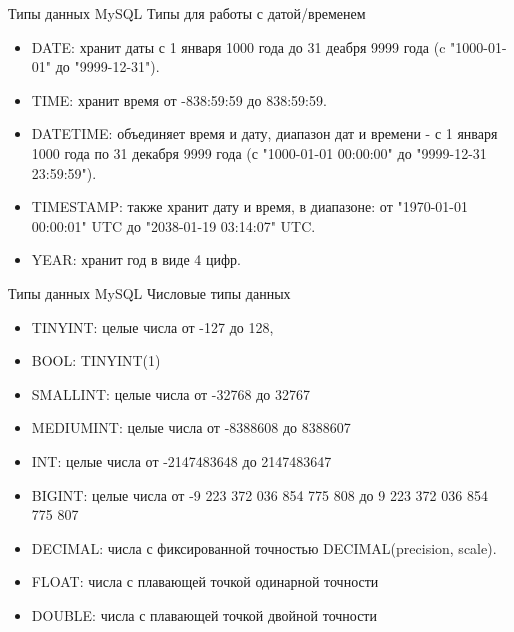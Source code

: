 \documentclass{beamer}
\begin{document}
\begin{frame}{Типы данных MySQL}
	Типы для работы с датой/временем
	\begin{itemize}
		\item DATE: хранит даты с 1 января 1000 года до 31 деабря 9999 года (c "1000-01-01" до "9999-12-31"). 
		\item TIME: хранит время от -838:59:59 до 838:59:59. 
		\item DATETIME: объединяет время и дату, диапазон дат и времени - с 1 января 1000 года по 31 декабря 9999 		года (с "1000-01-01 00:00:00" до "9999-12-31 23:59:59"). 
		\item TIMESTAMP: также хранит дату и время, в диапазоне: от "1970-01-01 00:00:01" UTC до "2038-01-19 03:14:07" UTC. 
		\item YEAR: хранит год в виде 4 цифр. 
	\end{itemize}
\end{frame}

\begin{frame}{Типы данных MySQL}
	Числовые типы данных
	\begin{itemize}
		\item TINYINT: целые числа от -127 до 128, 
		\item BOOL: TINYINT(1) 
		\item SMALLINT:  целые числа от -32768 до 32767
		\item MEDIUMINT: целые числа от -8388608 до 8388607
		\item INT: целые числа от -2147483648 до 2147483647
		\item BIGINT: целые числа от -9 223 372 036 854 775 808 до 9 223 372 036 854 775 807
		\item DECIMAL: числа с фиксированной точностью DECIMAL(precision, scale).
		\item FLOAT: числа с плавающей точкой одинарной точности
		\item DOUBLE: числа с плавающей точкой двойной точности 
	\end{itemize}
\end{frame}
\end{document}
